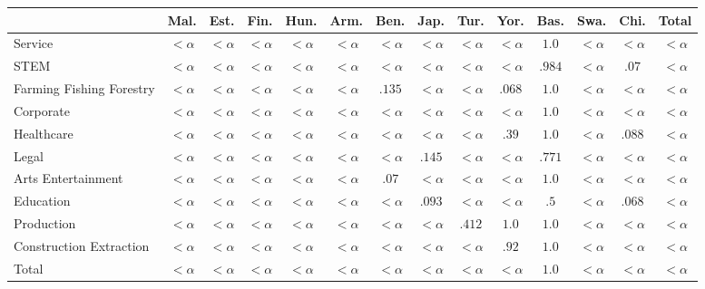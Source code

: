\documentclass[twoside,11pt]{article}
\begin{document}
\begin{table}[H]
\centering
\footnotesize\setlength{\tabcolsep}{2.5pt}
\small
\begin{tabular}{|m{1.75cm}|cccccccccccc|c|}
\hline
& Mal. & Est. & Fin. & Hun. & Arm. & Ben. & Jap. & Tur. & Yor. & Bas. & Swa. & Chi. & Total \\ \hline
Service	&	$<\alpha$	&	$<\alpha$	&	$<\alpha$	&	$<\alpha$	&	$<\alpha$	&	$<\alpha$	&	$<\alpha$	&	$<\alpha$	&	$<\alpha$	&	\cellcolor{blue!45}$1.0$	&	$<\alpha$	&	$<\alpha$	&	$<\alpha$	 \\ \hline 
STEM	&	$<\alpha$	&	$<\alpha$	&	$<\alpha$	&	$<\alpha$	&	$<\alpha$	&	$<\alpha$	&	$<\alpha$	&	$<\alpha$	&	$<\alpha$	&	\cellcolor{blue!45}$.984$	&	$<\alpha$	&	\cellcolor{blue!25}$.07$	&	$<\alpha$	 \\ \hline 
Farming 
 Fishing 
 Forestry	&	$<\alpha$	&	$<\alpha$	&	$<\alpha$	&	$<\alpha$	&	$<\alpha$	&	\cellcolor{blue!25}$.135$	&	$<\alpha$	&	$<\alpha$	&	\cellcolor{blue!25}$.068$	&	\cellcolor{blue!45}$1.0$	&	$<\alpha$	&	$<\alpha$	&	$<\alpha$	 \\ \hline 
Corporate	&	$<\alpha$	&	$<\alpha$	&	$<\alpha$	&	$<\alpha$	&	$<\alpha$	&	$<\alpha$	&	$<\alpha$	&	$<\alpha$	&	$<\alpha$	&	\cellcolor{blue!45}$1.0$	&	$<\alpha$	&	$<\alpha$	&	$<\alpha$	 \\ \hline 
Healthcare	&	$<\alpha$	&	$<\alpha$	&	$<\alpha$	&	$<\alpha$	&	$<\alpha$	&	$<\alpha$	&	$<\alpha$	&	$<\alpha$	&	\cellcolor{blue!25}$.39$	&	\cellcolor{blue!45}$1.0$	&	$<\alpha$	&	\cellcolor{blue!25}$.088$	&	$<\alpha$	 \\ \hline 
Legal	&	$<\alpha$	&	$<\alpha$	&	$<\alpha$	&	$<\alpha$	&	$<\alpha$	&	$<\alpha$	&	\cellcolor{blue!25}$.145$	&	$<\alpha$	&	$<\alpha$	&	\cellcolor{blue!25}$.771$	&	$<\alpha$	&	$<\alpha$	&	$<\alpha$	 \\ \hline 
Arts 
 Entertainment	&	$<\alpha$	&	$<\alpha$	&	$<\alpha$	&	$<\alpha$	&	$<\alpha$	&	\cellcolor{blue!25}$.07$	&	$<\alpha$	&	$<\alpha$	&	$<\alpha$	&	\cellcolor{blue!45}$1.0$	&	$<\alpha$	&	$<\alpha$	&	$<\alpha$	 \\ \hline 
Education	&	$<\alpha$	&	$<\alpha$	&	$<\alpha$	&	$<\alpha$	&	$<\alpha$	&	$<\alpha$	&	\cellcolor{blue!25}$.093$	&	$<\alpha$	&	$<\alpha$	&	\cellcolor{blue!25}$.5$	&	$<\alpha$	&	\cellcolor{blue!25}$.068$	&	$<\alpha$	 \\ \hline 
Production	&	$<\alpha$	&	$<\alpha$	&	$<\alpha$	&	$<\alpha$	&	$<\alpha$	&	$<\alpha$	&	$<\alpha$	&	\cellcolor{blue!25}$.412$	&	\cellcolor{blue!45}$1.0$	&	\cellcolor{blue!45}$1.0$	&	$<\alpha$	&	$<\alpha$	&	$<\alpha$	 \\ \hline 
Construction 
 Extraction	&	$<\alpha$	&	$<\alpha$	&	$<\alpha$	&	$<\alpha$	&	$<\alpha$	&	$<\alpha$	&	$<\alpha$	&	$<\alpha$	&	\cellcolor{blue!25}$.92$	&	\cellcolor{blue!45}$1.0$	&	$<\alpha$	&	$<\alpha$	&	$<\alpha$	 \\ \hline 
Total	&	$<\alpha$	&	$<\alpha$	&	$<\alpha$	&	$<\alpha$	&	$<\alpha$	&	$<\alpha$	&	$<\alpha$	&	$<\alpha$	&	$<\alpha$	&	\cellcolor{blue!45}$1.0$	&	$<\alpha$	&	$<\alpha$	&	$<\alpha$	 \\ \hline 


\end{tabular}
\end{table}
\end{document}
